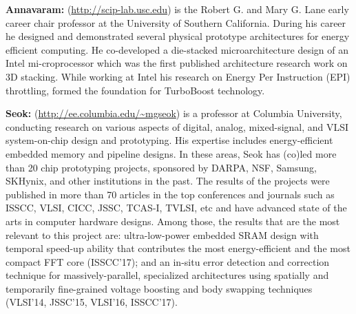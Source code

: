 \noindent
\textbf{Annavaram:} (\url{http://scip-lab.usc.edu}) is the Robert G. and Mary G. Lane early career chair professor at the University of Southern California. 
During his career he designed and demonstrated several physical prototype architectures for energy efficient computing. 
He co-developed a die-stacked microarchitecture design of an Intel mi-croprocessor which was the first published architecture research work on 3D stacking. 
While working at Intel his research on Energy Per Instruction (EPI) throttling, formed the foundation for TurboBoost technology.

\noindent
\textbf{Seok:} (\url{http://ee.columbia.edu/~mgseok}) is a professor at Columbia University, conducting research on various aspects of digital, analog, mixed-signal, and VLSI system-on-chip design and prototyping. 
His expertise includes energy-efficient embedded memory and pipeline designs. 
In these areas, Seok has (co)led more than 20 chip prototyping projects, sponsored by DARPA, NSF, Samsung, SKHynix, and other institutions in the past. 
The results of the projects were published in more than 70 articles in the top conferences and journals such as ISSCC, VLSI, CICC, JSSC, TCAS-I, TVLSI, etc and have advanced state of the arts in computer hardware designs. 
Among those, the results that are the most relevant to this project are: ultra-low-power embedded SRAM design with temporal speed-up ability that contributes the most energy-efficient and the most compact FFT core (ISSCC’17); 
and an in-situ error detection and correction technique for massively-parallel, specialized architectures using spatially and temporarily fine-grained voltage boosting and body swapping techniques (VLSI’14, JSSC’15, VLSI’16, ISSCC’17). 
